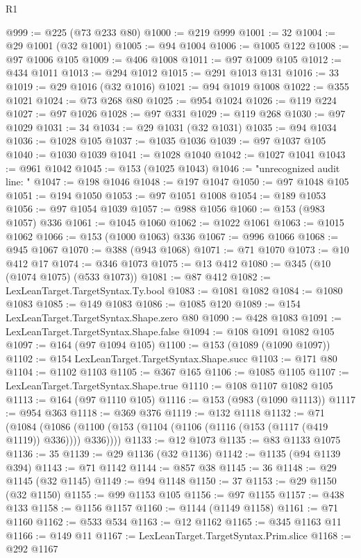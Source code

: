 \begin{lexlean}{R1}
\begin{coremodule}
{{{{{{{{{{{{{{{{{{{{{{{{{{{{{{{{{{{{{{{{{{{{{{{{{{{{{{{{{{{{{{{{{{{{{{{{{{{{{{{{{{{{{{{{{{{{{{{{{{{{{{{{{{{{{{{{{{{{{{{{{{{{{{{{{{{{{{{{{{{{{{{{{{{{{{{{{{{{{{{{{{{{{{{{{{{{{{{{{{{{{{{{{{@999 := @225 (@73 @233 @80)
@1000 := @219 @999
@1001 := 32
@1004 := @29 @1001 (@32 @1001)
@1005 := @94 @1004
@1006 := @1005 @122
@1008 := @97 @1006 @105
@1009 := @406 @1008
@1011 := @97 @1009 @105
@1012 := @434 @1011
@1013 := @294 @1012
@1015 := @291 @1013 @131
@1016 := 33
@1019 := @29 @1016 (@32 @1016)
@1021 := @94 @1019 @1008
@1022 := @355 @1021
@1024 := @73 @268 @80
@1025 := @954 @1024
@1026 := @119 @224
@1027 := @97 @1026
@1028 := @97 @331
@1029 := @119 @268
@1030 := @97 @1029
@1031 := 34
@1034 := @29 @1031 (@32 @1031)
@1035 := @94 @1034
@1036 := @1028 @105
@1037 := @1035 @1036
@1039 := @97 @1037 @105
@1040 := @1030 @1039
@1041 := @1028 @1040
@1042 := @1027 @1041
@1043 := @961 @1042
@1045 := @153 (@1025 @1043)
@1046 := "unrecognized audit line: "
@1047 := @198 @1046
@1048 := @197 @1047
@1050 := @97 @1048 @105
@1051 := @194 @1050
@1053 := @97 @1051 @1008
@1054 := @189 @1053
@1056 := @97 @1054 @1039
@1057 := @988 @1056
@1060 := @153 (@983 @1057) @336
@1061 := @1045 @1060
@1062 := @1022 @1061
@1063 := @1015 @1062
@1066 := @153 (@1000 @1063) @336
@1067 := @996 @1066
@1068 := @945 @1067
@1070 := @388 (@943 @1068)
@1071 := @71 @1070
@1073 := @10 @412 @17
@1074 := @346 @1073
@1075 := @13 @412
@1080 := @345 (@10 (@1074 @1075) (@533 @1073))
@1081 := @87 @412
@1082 := LexLeanTarget.TargetSyntax.Ty.bool
@1083 := @1081 @1082
@1084 := @1080 @1083
@1085 := @149 @1083
@1086 := @1085 @120
@1089 := @154 LexLeanTarget.TargetSyntax.Shape.zero @80
@1090 := @428 @1083
@1091 := LexLeanTarget.TargetSyntax.Shape.false
@1094 := @108 @1091 @1082 @105
@1097 := @164 (@97 @1094 @105)
@1100 := @153 (@1089 (@1090 @1097))
@1102 := @154 LexLeanTarget.TargetSyntax.Shape.succ
@1103 := @171 @80
@1104 := @1102 @1103
@1105 := @367 @165
@1106 := @1085 @1105
@1107 := LexLeanTarget.TargetSyntax.Shape.true
@1110 := @108 @1107 @1082 @105
@1113 := @164 (@97 @1110 @105)
@1116 := @153 (@983 (@1090 @1113))
@1117 := @954 @363
@1118 := @369 @376
@1119 := @132 @1118
@1132 := @71
    (@1084 (@1086 (@1100 (@153 (@1104 (@1106 (@1116 (@153 (@1117 (@419 @1119)) @336)))) @336))))
@1133 := @12 @1073
@1135 := @83 @1133 @1075
@1136 := 35
@1139 := @29 @1136 (@32 @1136)
@1142 := @1135 (@94 @1139 @394)
@1143 := @71 @1142
@1144 := @857 @38
@1145 := 36
@1148 := @29 @1145 (@32 @1145)
@1149 := @94 @1148
@1150 := 37
@1153 := @29 @1150 (@32 @1150)
@1155 := @99 @1153 @105
@1156 := @97 @1155
@1157 := @438 @133
@1158 := @1156 @1157
@1160 := @1144 (@1149 @1158)
@1161 := @71 @1160
@1162 := @533 @534
@1163 := @12 @1162
@1165 := @345 @1163 @11
@1166 := @149 @11
@1167 := LexLeanTarget.TargetSyntax.Prim.slice
@1168 := @292 @1167
}}}}}}}}}}}}}}}}}}}}}}}}}}}}}}}}}}}}}}}}}}}}}}}}}}}}}}}}}}}}}}}}}}}}}}}}}}}}}}}}}}}}}}}}}}}}}}}}}}}}}}}}}}}}}}}}}}}}}}}}}}}}}}}}}}}}}}}}}}}}}}}}}}}}}}}}}}}}}}}}}}}}}}}}}}}}}}}}}}}}}}}}}}
\end{coremodule}
\end{lexlean}
